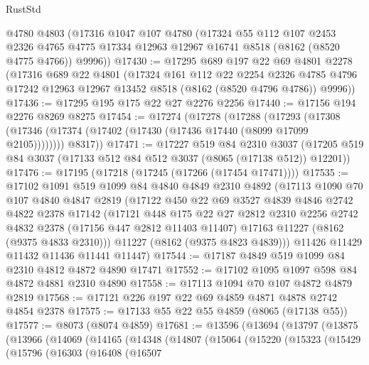 \begin{lexlean}{RustStd}
\begin{coremodule}
    @4780
    @4803
    (@17316
      @1047
      @107
      @4780
      (@17324
        @55
        @112
        @107
        @2453
        @2326
        @4765
        @4775
        @17334
        @12963
        @12967
        @16741
        @8518
        (@8162 (@8520 @4775 @4766))
        @9996))
@17430 := @17295
    @689
    @197
    @22
    @69
    @4801
    @2278
    (@17316
      @689
      @22
      @4801
      (@17324
        @161
        @112
        @22
        @2254
        @2326
        @4785
        @4796
        @17242
        @12963
        @12967
        @13452
        @8518
        (@8162 (@8520 @4796 @4786))
        @9996))
@17436 := @17295 @195 @175 @22 @27 @2276 @2256
@17440 := @17156 @194 @2276 @8269 @8275
@17454 := @17274
    (@17278
      (@17288
        (@17293 (@17308 (@17346 (@17374 (@17402 (@17430 (@17436 @17440 (@8099 @17099 @2105))))))))
        @8317))
@17471 := @17227
    @519
    @84
    @2310
    @3037
    (@17205 @519 @84 @3037 (@17133 @512 @84 @512 @3037 (@8065 (@17138 @512)) @12201))
@17476 := @17195 (@17218 (@17245 (@17266 (@17454 @17471))))
@17535 := @17102
    @1091
    @519
    @1099
    @84
    @4840
    @4849
    @2310
    @4892
    (@17113
      @1090
      @70
      @107
      @4840
      @4847
      @2819
      (@17122
        @450
        @22
        @69
        @3527
        @4839
        @4846
        @2742
        @4822
        @2378
        @17142
        (@17121
          @448
          @175
          @22
          @27
          @2812
          @2310
          @2256
          @2742
          @4832
          @2378
          (@17156 @447 @2812 @11403 @11407)
          @17163
          @11227
          (@8162 (@9375 @4833 @2310)))
        @11227
        (@8162 (@9375 @4823 @4839)))
      @11426
      @11429
      @11432
      @11436
      @11441
      @11447)
@17544 := @17187 @4849 @519 @1099 @84 @2310 @4812 @4872 @4890 @17471
@17552 := @17102 @1095 @1097 @598 @84 @4872 @4881 @2310 @4890
@17558 := @17113 @1094 @70 @107 @4872 @4879 @2819
@17568 := @17121 @226 @197 @22 @69 @4859 @4871 @4878 @2742 @4854 @2378
@17575 := @17133 @55 @22 @55 @4859 (@8065 (@17138 @55))
@17577 := @8073 (@8074 @4859)
@17681 := @13596
    (@13694
      (@13797
        (@13875
          (@13966
            (@14069
              (@14165
                (@14348
                  (@14807
                    (@15064
                      (@15220
                        (@15323
                          (@15429
                            (@15796
                              (@16303
                                (@16408
                                  (@16507

\end{coremodule}
\end{lexlean}
